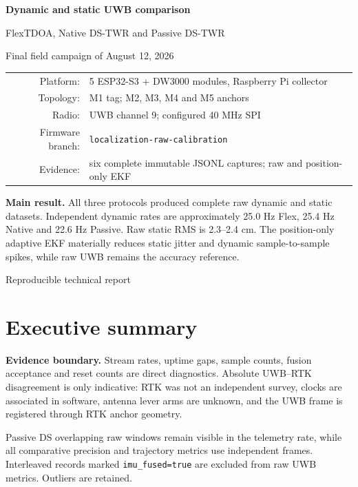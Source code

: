 \documentclass[10pt,a4paper]{article}
\begin{document}
\begin{titlepage}
\centering
\vspace*{18mm}
{\Huge\bfseries Dynamic and static UWB comparison\par}
\vspace{4mm}
{\Large FlexTDOA, Native DS-TWR and Passive DS-TWR\par}
\vspace{14mm}
{\large Final field campaign of August 12, 2026\par}
\vspace{12mm}
\begin{tabular}{rl}
Platform: & 5 ESP32-S3 + DW3000 modules, Raspberry Pi collector\\
Topology: & M1 tag; M2, M3, M4 and M5 anchors\\
Radio: & UWB channel 9; configured 40 MHz SPI\\
Firmware branch: & \texttt{localization-raw-calibration}\\
Evidence: & six complete immutable JSONL captures; raw and position-only EKF\\
\end{tabular}
\vfill
\colorbox{info}{\parbox{0.88\textwidth}{\vspace{2mm}
\textbf{Main result.} All three protocols produced complete raw dynamic and
static datasets. Independent dynamic rates are approximately 25.0 Hz Flex,
25.4 Hz Native and 22.6 Hz Passive. Raw static RMS is 2.3--2.4 cm. The
position-only adaptive EKF materially reduces static jitter and dynamic
sample-to-sample spikes, while raw UWB remains the accuracy reference.\vspace{2mm}}}
\vfill
{\large Reproducible technical report\par}
\end{titlepage}
\tableofcontents
\clearpage
{}

\section{Executive summary}
\colorbox{warning}{\parbox{0.96\textwidth}{\textbf{Evidence boundary.}
Stream rates, uptime gaps, sample counts, fusion acceptance and reset counts are
direct diagnostics. Absolute UWB--RTK disagreement is only indicative: RTK was
not an independent survey, clocks are associated in software, antenna lever
arms are unknown, and the UWB frame is registered through RTK anchor geometry.}}

Passive DS overlapping raw windows remain visible in the telemetry rate, while
all comparative precision and trajectory metrics use independent frames.
Interleaved records marked \texttt{imu\_fused=true} are excluded from raw UWB
metrics. Outliers are retained.
\end{document}
